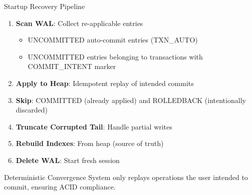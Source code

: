\documentclass[aspectratio=169]{beamer}
\begin{document}
\begin{frame}{Startup Recovery Pipeline}
\begin{enumerate}
  \item \textbf{Scan WAL}: Collect re-applicable entries
  \begin{itemize}
    \item UNCOMMITTED auto-commit entries (TXN\_AUTO)
    \item UNCOMMITTED entries belonging to transactions with COMMIT\_INTENT marker
  \end{itemize}
  \item \textbf{Apply to Heap}: Idempotent replay of intended commits
  \item \textbf{Skip}: COMMITTED (already applied) and ROLLEDBACK (intentionally discarded)
  \item \textbf{Truncate Corrupted Tail}: Handle partial writes
  \item \textbf{Rebuild Indexes}: From heap (source of truth)
  \item \textbf{Delete WAL}: Start fresh session
\end{enumerate}

\vspace{0.5cm}
\begin{block}{Deterministic Convergence}
System only replays operations the user intended to commit, ensuring ACID compliance.
\end{block}
\end{frame}
\end{document}
